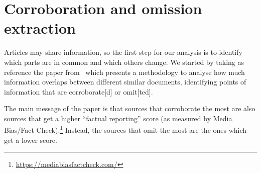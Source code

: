 













\section{\statusgreen Corroboration and omission extraction}
\label{sec:cgs_cross_referencing}
Articles may share information, so the first step for our analysis is to identify which parts are in common and which others change.
We started by taking as reference the paper from~\citet{bountouridis2018explaining} which presents a methodology to analyse how much information overlaps between different similar documents, identifying points of information that are \gls{corroborate}[d] or \gls{omit}[ted].

The main message of the paper is that sources that \gls{corroborate} the most are also sources that get a higher ``factual reporting'' score (as measured by Media Bias/Fact Check).\footnote{\url{https://mediabiasfactcheck.com/}}
Instead, the sources that \gls{omit} the most are the ones which get a lower score.

